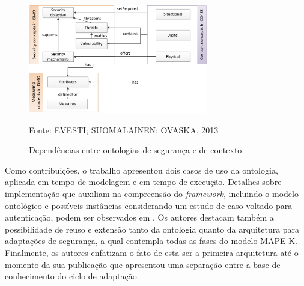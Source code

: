 \documentclass[tid,table]{texufpel} %
\begin{document}
\begin{figure}[ht]
\centering
\includegraphics[width=0.7\textwidth]{imagens/ismo-ontology.png}
\caption{Dependências entre ontologias de segurança e de contexto}
\label{ismo-ontology}
Fonte: EVESTI; SUOMALAINEN; OVASKA, 2013
\end{figure}


Como contribuições, o trabalho apresentou dois casos de uso da ontologia, aplicada em tempo de modelagem e em tempo de execução. Detalhes sobre implementação que auxiliam na compreensão do \textit{framework}, incluindo o modelo ontológico e possíveis instâncias considerando um estudo de caso voltado para autenticação, podem ser observados em \cite{evesti11}. Os autores destacam também a possibilidade de reuso e extensão tanto da ontologia quanto da arquitetura para adaptações de segurança, a qual contempla todas as fases do modelo MAPE-K. Finalmente, os autores enfatizam o fato de esta ser a primeira arquitetura até o momento da sua publicação que apresentou uma separação entre a base de conhecimento do ciclo de adaptação. 
\end{document}
